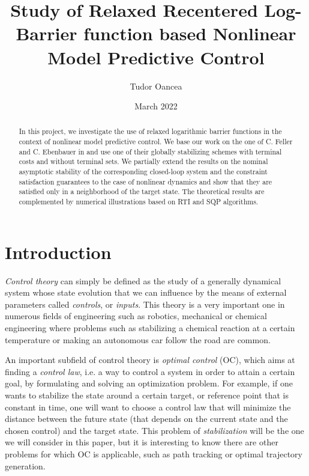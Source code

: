 \documentclass[12pt]{article}
\title{Study of Relaxed Recentered Log-Barrier function based Nonlinear Model Predictive Control}
\author{Tudor Oancea}
\date{March 2022}
\begin{document}
\maketitle

\begin{abstract}
	In this project, we investigate the use of relaxed logarithmic barrier functions in the context of nonlinear model predictive control.
	We base our work on the one of C. Feller and C. Ebenbauer in \cite{RRLB-linear-MPC} and use one of their globally stabilizing schemes with terminal costs and without terminal sets.
	We partially extend the results on the nominal asymptotic stability of the corresponding closed-loop system and the constraint satisfaction guarantees to the case of nonlinear dynamics and show that they are satisfied only in a neighborhood of the target state.
	The theoretical results are complemented by numerical illustrations based on RTI and SQP algorithms.
\end{abstract}

\section{Introduction}
\textit{Control theory} can simply be defined as the study of a generally dynamical system whose state evolution that we can influence by the means of external parameters called \textit{controls}, or \textit{inputs}.
This theory is a very important one in numerous fields of engineering such as robotics, mechanical or chemical engineering where problems such as stabilizing a chemical reaction at a certain temperature or making an autonomous car follow the road are common.

An important subfield of control theory is \textit{optimal control} (OC), which aims at finding a \textit{control law}, i.e. a way to control a system in order to attain a certain goal, by formulating and solving an optimization problem.
For example, if one wants to stabilize the state around a certain target, or reference point that is constant in time, one will want to choose a control law that will minimize the distance between the future state (that depends on the current state and the chosen control) and the target state.
This problem of \textit{stabilization} will be the one we will consider in this paper, but it is interesting to know there are other problems for which OC is applicable, such as path tracking or optimal trajectory generation.
\end{document}
